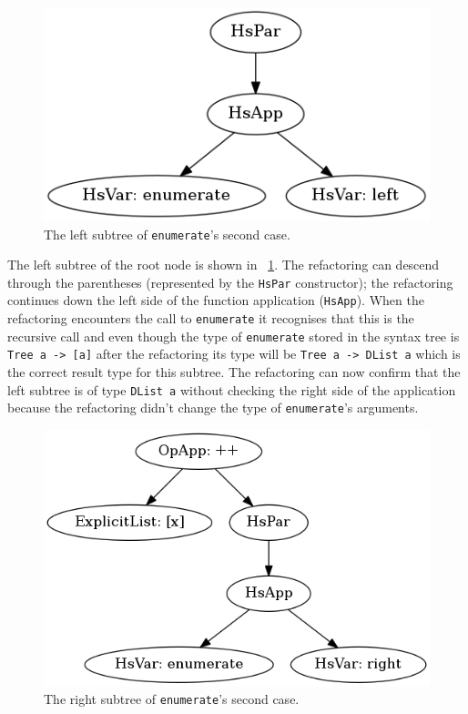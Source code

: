 \begin{figure}[h]
	\begin{center}
		\includegraphics[scale=.5]{graphVis/Chapter3/enumLeft.png}
	\end{center}
	\caption{The left subtree of \texttt{enumerate}'s second case.}
	\label{enumLeft}
\end{figure}

The left subtree of the root node is shown in \DIFdelbegin {}\DIFdelend \DIFaddbegin {}\DIFaddend ~\ref{enumLeft}. The refactoring can descend through the parentheses (represented by the \texttt{HsPar} constructor); the refactoring continues down the left side of the function application (\texttt{HsApp}). When the refactoring encounters the call to \texttt{enumerate} it recognises that this is the recursive call and even though the type of \texttt{enumerate} stored in the syntax tree is \texttt{Tree a -> [a]} after the refactoring its type will be \texttt{Tree a -> DList a} which is the correct result type  for this subtree. The refactoring can now confirm that the left subtree is of type \texttt{DList a} without checking the right side of the application because the refactoring didn't change the type of \texttt{enumerate}'s arguments.

\begin{figure}[h]
	\begin{center}
		\includegraphics[scale=.5]{graphVis/Chapter3/enumRight.png}
	\end{center}
	\caption{The right subtree of \texttt{enumerate}'s second case.}
	\label{enumRight}
\end{figure}

